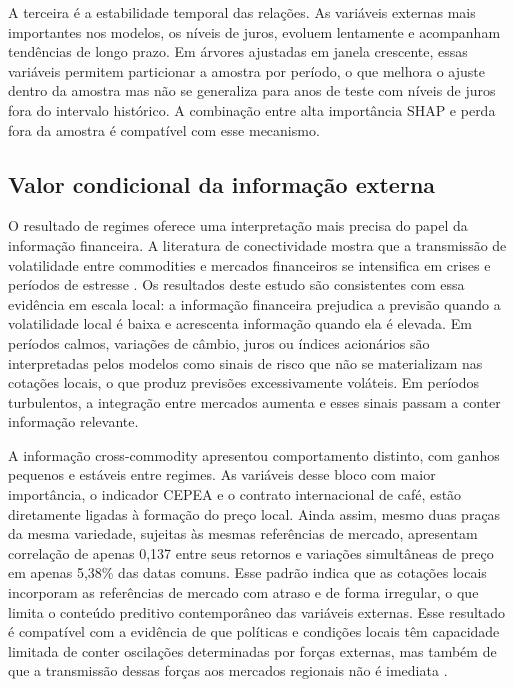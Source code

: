 \documentclass[a4paper,fleqn]{cas-sc}
\begin{document}
A terceira é a estabilidade temporal das relações. As variáveis externas mais importantes nos modelos, os níveis de juros, evoluem lentamente e acompanham tendências de longo prazo. Em árvores ajustadas em janela crescente, essas variáveis permitem particionar a amostra por período, o que melhora o ajuste dentro da amostra mas não se generaliza para anos de teste com níveis de juros fora do intervalo histórico. A combinação entre alta importância SHAP e perda fora da amostra é compatível com esse mecanismo.

\subsection{Valor condicional da informação externa}
\label{subsec:disc_conditional}

O resultado de regimes oferece uma interpretação mais precisa do papel da informação financeira. A literatura de conectividade mostra que a transmissão de volatilidade entre commodities e mercados financeiros se intensifica em crises e períodos de estresse \citep{Singh2026OilSoftCommoditySpillovers,Zhou2026CommodityConnectedness}. Os resultados deste estudo são consistentes com essa evidência em escala local: a informação financeira prejudica a previsão quando a volatilidade local é baixa e acrescenta informação quando ela é elevada. Em períodos calmos, variações de câmbio, juros ou índices acionários são interpretadas pelos modelos como sinais de risco que não se materializam nas cotações locais, o que produz previsões excessivamente voláteis. Em períodos turbulentos, a integração entre mercados aumenta e esses sinais passam a conter informação relevante.

A informação cross-commodity apresentou comportamento distinto, com ganhos pequenos e estáveis entre regimes. As variáveis desse bloco com maior importância, o indicador CEPEA e o contrato internacional de café, estão diretamente ligadas à formação do preço local. Ainda assim, mesmo duas praças da mesma variedade, sujeitas às mesmas referências de mercado, apresentam correlação de apenas 0,137 entre seus retornos e variações simultâneas de preço em apenas 5,38\% das datas comuns. Esse padrão indica que as cotações locais incorporam as referências de mercado com atraso e de forma irregular, o que limita o conteúdo preditivo contemporâneo das variáveis externas. Esse resultado é compatível com a evidência de que políticas e condições locais têm capacidade limitada de conter oscilações determinadas por forças externas, mas também de que a transmissão dessas forças aos mercados regionais não é imediata \citep{Fahmi2023LocalCoffeePolicy,AliagaMiranda2026CoffeeShocks}.
\end{document}
